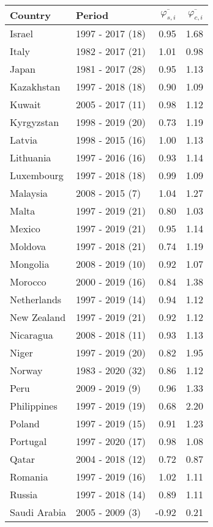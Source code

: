\begin{table}[H]
{{\centering 
\begin{tabular}{llrr}
\toprule
Country & Period & $\overline{\varphi_{s,i}}$ & $\overline{\varphi_{c,i}}$\\
\midrule
Israel & 1997 - 2017 (18) & 0.95 & 1.68\\
Italy & 1982 - 2017 (21) & 1.01 & 0.98\\
Japan & 1981 - 2017 (28) & 0.95 & 1.13\\
Kazakhstan & 1997 - 2018 (18) & 0.90 & 1.09\\
Kuwait & 2005 - 2017 (11) & 0.98 & 1.12\\
\addlinespace
Kyrgyzstan & 1998 - 2019 (20) & 0.73 & 1.19\\
Latvia & 1998 - 2015 (16) & 1.00 & 1.13\\
Lithuania & 1997 - 2016 (16) & 0.93 & 1.14\\
Luxembourg & 1997 - 2018 (18) & 0.99 & 1.09\\
Malaysia & 2008 - 2015 (7) & 1.04 & 1.27\\
\addlinespace
Malta & 1997 - 2019 (21) & 0.80 & 1.03\\
Mexico & 1997 - 2019 (21) & 0.95 & 1.14\\
Moldova & 1997 - 2018 (21) & 0.74 & 1.19\\
Mongolia & 2008 - 2019 (10) & 0.92 & 1.07\\
Morocco & 2000 - 2019 (16) & 0.84 & 1.38\\
\addlinespace
Netherlands & 1997 - 2019 (14) & 0.94 & 1.12\\
New Zealand & 1997 - 2019 (21) & 0.92 & 1.12\\
Nicaragua & 2008 - 2018 (11) & 0.93 & 1.13\\
Niger & 1997 - 2019 (20) & 0.82 & 1.95\\
Norway & 1983 - 2020 (32) & 0.86 & 1.12\\
\addlinespace
Peru & 2009 - 2019 (9) & 0.96 & 1.33\\
Philippines & 1997 - 2019 (19) & 0.68 & 2.20\\
Poland & 1997 - 2019 (15) & 0.91 & 1.23\\
Portugal & 1997 - 2020 (17) & 0.98 & 1.08\\
Qatar & 2004 - 2018 (12) & 0.72 & 0.87\\
\addlinespace
Romania & 1997 - 2019 (16) & 1.02 & 1.11\\
Russia & 1997 - 2018 (14) & 0.89 & 1.11\\
Saudi Arabia & 2005 - 2009 (3) & -0.92 & 0.21\\

\end{tabular}}}
\end{table}
